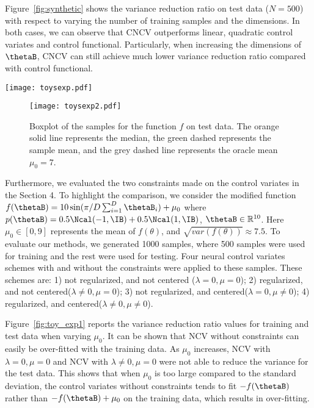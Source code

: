 \documentclass[runningheads]{llncs}
\begin{document}
Figure~\ref{fig:synthetic} shows the variance reduction ratio on test data ($N=500$) with respect to varying the number of  training samples and the dimensions. In both cases, we can observe that CNCV outperforms linear, quadratic control variates and control functional. Particularly, when increasing the dimensions of $\thetaB$, CNCV can still achieve much lower variance reduction ratio compared with control functional. 

\begin{figure*}[ht!]
\centering
\texttt{[image: toysexp.pdf]}
\vspace{-0.45cm}
\caption{\small Variance reduction ratio of four types of NCV versus the oracle mean $\mu_0$. The $\mu$ in the control variates was initialized to $0$. Dashed and solid lines plot the results on training and test data respectively.}
\label{fig:toy_exp1}
\end{figure*}

\begin{figure}[ht!]
\centering
\vskip -0.1in
\texttt{[image: toysexp2.pdf]}
\vspace{-0.45cm}
\caption{\small Boxplot of the samples for the function $f$ on test data. The orange solid line represents the median, the green dashed represents the sample mean, and the grey dashed line represents the oracle mean $\mu_0 = 7$.}
\label{fig:toy_exp2}
\end{figure}



Furthermore, we evaluated the two constraints made on the control variates in the Section 4. To highlight the comparison, we consider the modified function $f(\thetaB) = 10 \sin(\pi /D \sum_{i=1}^D \thetaB_i ) + \mu_0$ where $p(\thetaB) = 0.5\Ncal(-1, \IB) + 0.5 \Ncal(1,\IB)$, $\thetaB \in \mathbb{R}^{10}$. Here $\mu_0\in [0,9]$ represents the mean of $f(\theta)$, and $\sqrt{var(f(\theta))}\approx 7.5$. To evaluate our methods, we generated 1000 samples, where 500 samples were used for training and the rest were used for testing. Four neural control variates schemes with and without the constraints were applied to these samples. These schemes are: 1) not regularized, and not centered ($\lambda = 0, \mu=0$); 2) regularized, and not centered($\lambda \neq 0, \mu=0$); 3) not regularized, and centered($\lambda =0, \mu \neq 0$); 4) regularized, and centered($\lambda \neq 0, \mu \neq 0$).

Figure~\ref{fig:toy_exp1} reports the variance reduction ratio values for training and test data when varying $\mu_0$. It can be shown that NCV without constraints can easily be over-fitted with the training data. As $\mu_0$ increases, NCV with $\lambda = 0, \mu=0$ and NCV with $\lambda \neq 0, \mu=0$ were not able to reduce the variance for the test data. This shows that when $\mu_0$ is too large compared to the standard deviation, the control variates without constraints tends to fit $-f(\thetaB)$ rather than $-f(\thetaB) + \mu_0$ on the training data, which results in over-fitting. 
\end{document}
